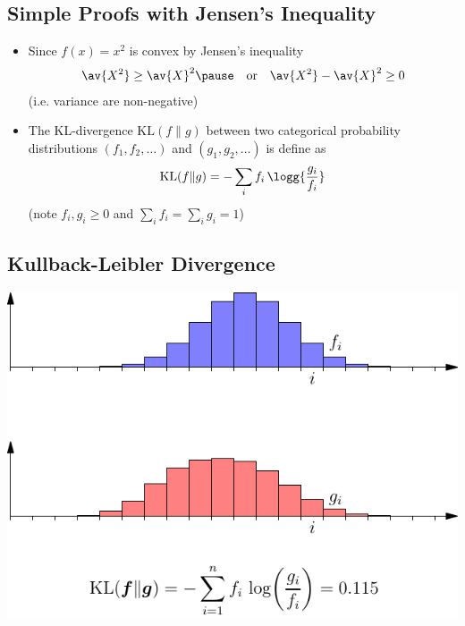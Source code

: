 
\begin{slide}
\section{Simple Proofs with Jensen's Inequality}

\begin{PauseHighLight}
  \begin{itemize}
  \item Since $f(x) = x^2$ is convex by Jensen's inequality
    \begin{align*}
      \av{X^2} \geq \av{X}^2\pause \quad \text{or} \quad
      \av{X^2}-\av{X}^2 \geq 0
    \end{align*}
    (i.e. variance are non-negative)\pause
  \item The KL-divergence $\mathrm{KL}(f \| g)$ between two
    categorical probability distributions $(f_1,f_2,\ldots)$ and
    $(g_1,g_2,\ldots)$ is define as
    \begin{align*}
      \mathrm{KL}(f \| g) = - \sum_i f_i \, \logg{\frac{g_i}{f_i}}
    \end{align*}
    (note $f_i,g_i\geq 0$ and $\sum\limits_i f_i = \sum\limits_i g_i
    =1 $)\pause
  \end{itemize}
\end{PauseHighLight}

\end{slide}


\begin{slide}
\section[-2]{Kullback-Leibler Divergence}

\begin{center}
  \includegraphics[width=0.9\linewidth]{klcat}
\end{center}
\end{slide}


